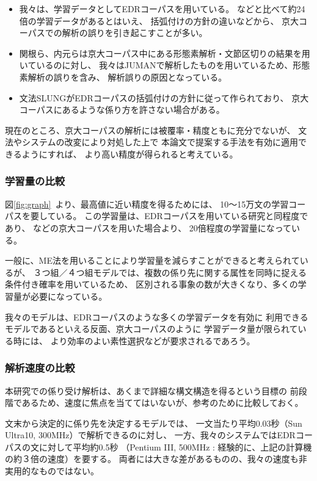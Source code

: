\begin{itemize}
\item
我々は、学習データとしてEDRコーパスを用いている。
\cite{Uchimoto99b}などと比べて約24倍の学習データがあるとはいえ、
括弧付けの方針の違いなどから、
京大コーパスでの解析の誤りを引き起こすことが多い。
\item
関根ら、内元らは京大コーパス中にある形態素解析・文節区切りの結果を用いているのに対し、
我々はJUMANで解析したものを用いているため、形態素解析の誤りを含み、
解析誤りの原因となっている。
\item
文法SLUNGがEDRコーパスの括弧付けの方針に従って作られており、
京大コーパスにあるような係り方を許さない場合がある。
\end{itemize}

現在のところ、京大コーパスの解析には被覆率・精度ともに充分でないが、
文法やシステムの改変により対処した上で
本論文で提案する手法を有効に適用できるようにすれば、
より高い精度が得られると考えている。

\subsubsection{学習量の比較}

図\ref{fig:graph}~より、最高値に近い精度を得るためには、
10〜15万文の学習コーパスを要している。
この学習量は、EDRコーパスを用いている研究\cite{Fujio99}と同程度であり、
\cite{Uchimoto99}などの京大コーパスを用いた場合より、
20倍程度の学習量になっている。

一般に、ME法を用いることにより学習量を減らすことができると考えられているが、
３つ組／４つ組モデルでは、複数の係り先に関する属性を同時に捉える
条件付き確率を用いているため、
区別される事象の数が大きくなり、多くの学習量が必要になっている。

我々のモデルは、EDRコーパスのような多くの学習データを有効に
利用できるモデルであるといえる反面、京大コーパスのように
学習データ量が限られている時には、
より効率のよい素性選択などが要求されるであろう。



\subsubsection{解析速度の比較}

本研究での係り受け解析は、あくまで詳細な構文構造を得るという目標の
前段階であるため、速度に焦点を当ててはいないが、参考のために比較しておく。

文末から決定的に係り先を決定するモデル\cite{Sekine99}では、
一文当たり平均0.03秒（Sun Ultra10, 300MHz）で解析できるのに対し、
一方、我々のシステムではEDRコーパスの文に対して平均約0.5秒
（Pentium III, 500MHz : 経験的に、上記の計算機の約３倍の速度）を要する。
両者には大きな差があるものの、我々の速度も非実用的なものではない。

